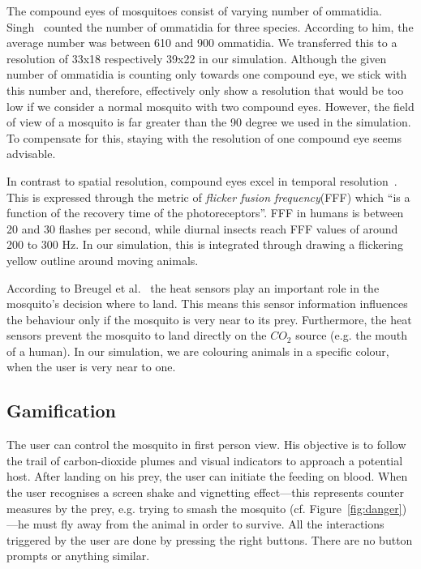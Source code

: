 \documentclass{sig-alternate-05-2015}
\begin{document}
The compound eyes of mosquitoes consist of varying number of ommatidia. Singh~\cite{singh2013} counted the number of ommatidia for three species. According to him, the average number was between 610 and 900 ommatidia. We transferred this to a resolution of 33x18 respectively 39x22 in our simulation. Although the given number of ommatidia is counting only towards one compound eye, we stick with this number and, therefore, effectively only show a resolution that would be too low if we consider a normal mosquito with two compound eyes. However, the field of view of a mosquito is far greater than the 90 degree we used in the simulation. To compensate for this, staying with the resolution of one compound eye seems advisable.



In contrast to spatial resolution, compound eyes excel in temporal resolution~\cite{lehane2005}. This is expressed through the metric of \textit{flicker fusion frequency}(FFF) which ``is a function of the recovery time of the photoreceptors''. FFF in humans is between 20 and 30 flashes per second, while diurnal insects reach FFF values of around 200 to 300 Hz. In our simulation, this is integrated through drawing a flickering yellow outline around moving animals.

According to Breugel et al.~\cite{breugel2015} the heat sensors play an important role in the mosquito's decision where to land. This means this sensor information influences the behaviour only if the mosquito is very near to its prey. Furthermore, the heat sensors prevent the mosquito to land directly on the $CO_2$ source (e.g. the mouth of a human). In our simulation, we are colouring animals in a specific colour, when the user is very near to one. 


\subsection{Gamification}
\label{sec:game}
The user can control the mosquito in first person view. His objective is to follow the trail of carbon-dioxide plumes and visual indicators to approach a potential host. After landing on his prey, the user can initiate the feeding on blood. When the user recognises a screen shake and vignetting effect---this represents counter measures by the prey, e.g. trying to smash the mosquito (cf. Figure~\ref{fig:danger})---he must fly away from the animal in order to survive. All the interactions triggered by the user are done by pressing the right buttons. There are no button prompts or anything similar.
\end{document}
